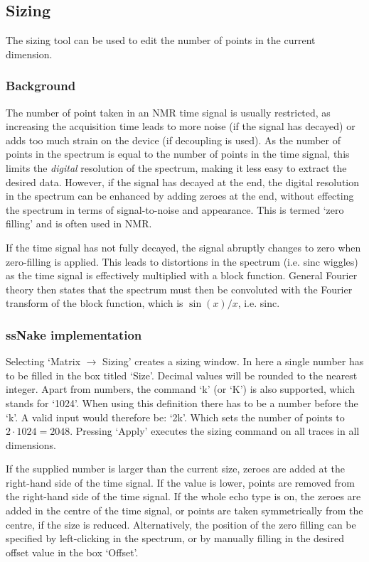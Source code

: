 \documentclass[11pt,a4paper]{article}
\begin{document}
\subsection{Sizing}
The sizing tool can be used to edit the number of points in the current dimension. 

\subsubsection*{Background}
The number of point taken in an NMR time signal is usually restricted, as increasing the acquisition time leads to more noise (if the signal has decayed) or adds too much strain on the device (if decoupling is used). As the number of points in the spectrum is equal to the number of points in the time signal, this limits the \textit{digital} resolution of the spectrum, making it less easy to extract the desired data. However, if the signal has decayed at the end, the digital resolution in the spectrum can be enhanced by adding zeroes at the end, without effecting the spectrum in terms of signal-to-noise and appearance. This is termed `zero filling' and is often used in NMR.

If the time signal has not fully decayed, the signal abruptly changes to zero when zero-filling is applied. This leads to distortions in the spectrum (i.e. sinc wiggles) as the time signal is effectively multiplied with a block function. General Fourier theory then states that the spectrum must then be convoluted with the Fourier transform of the block function, which is $\sin(x)/x$, i.e. sinc.

\subsubsection*{ssNake implementation}
Selecting `Matrix $\rightarrow$ Sizing' creates a sizing window. In here a single number has to be filled in the box titled `Size'. Decimal values will be rounded to the nearest integer. Apart from numbers, the command `k' (or `K') is also supported, which stands for `1024'. When using this definition there has to be a number before the `k'. A valid input would therefore be: `2k'. Which sets the number of points to $2 \cdot 1024=2048$. Pressing `Apply' executes the sizing command on all traces in all dimensions.

If the supplied number is larger than the current size, zeroes are added at the right-hand side of the time signal. If the value is lower, points are removed from the right-hand side of the time signal. If the whole echo type is on, the zeroes are added in the centre of the time signal, or points are taken symmetrically from the centre, if the size is reduced. Alternatively, the position of the zero filling can be specified by left-clicking in the spectrum, or by manually filling in the desired offset value in the box `Offset'.
\end{document}
